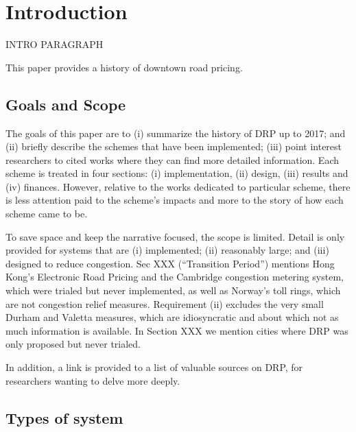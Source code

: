 \section{Introduction}

INTRO PARAGRAPH

This paper provides a history of downtown road pricing. 



\subsection{Goals and Scope}

The goals of this paper are to (i) summarize the history of DRP up to 2017; and (ii) briefly describe the schemes that have been implemented; (iii) point interest researchers to cited works where they can find more detailed information. Each scheme is treated in four sections: (i) implementation, (ii) design, (iii) results and (iv) finances. However, relative to the works dedicated to particular scheme, there is less attention paid to the scheme's impacts and more to the story of how each scheme came to be.

To save space and keep the narrative focused, the scope is limited. Detail is only provided for systems that are (i) implemented; (ii) reasonably large; and (iii) designed to reduce congestion. Sec XXX (``Transition Period'') mentions Hong Kong's Electronic Road Pricing and the Cambridge congestion metering system, which were trialed but never implemented, as well as Norway's toll rings, which are not congestion relief measures. Requirement (ii) excludes the very small Durham and Valetta measures, which are idiosyncratic and about which not as much information is available. In Section XXX we mention cities where DRP was only proposed but never trialed.

In addition, a link is provided to a list of valuable sources on DRP, for researchers wanting to delve more deeply.

\subsection{Types of system}


